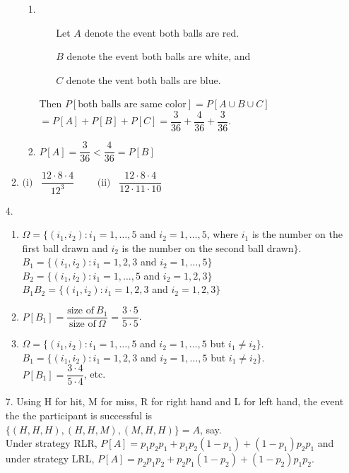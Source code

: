 \begin{enumerate}
\begin{enumerate}
\begin{enumerate}
			\item \begin{enumerate}
				\item[Let] $A$ denote the event both balls are red. 
				\item[] $B$ denote the event both balls are white, and 
				\item[] $C$ denote the vent both balls are blue. 
			\end{enumerate}
				Then $P[\text{both balls are same color}] = P[A\cup B\cup C]$ $= P[A]+P[B]+P[C] =  \dfrac{3}{36} + \dfrac{4}{36} + \dfrac{3}{36}$.
			
			\item $ P[A] = \dfrac{3}{36} < \dfrac{4}{36} = P[B]$
		\end{enumerate} 
		
		\item $\text{(i)}\;\;\; \dfrac{12\cdot 8\cdot 4}{12^3}\quad\quad$ $\text{(ii)}\;\;\; \dfrac{12\cdot 8\cdot 4}{12\cdot 11\cdot 10}$
		
	\end{enumerate}
	
	\newpage
	\item[4.] \begin{enumerate}
	
		\item $\Omega = \{(i_1,i_2)\colon i_1=1,\ldots,5$ and $i_2=1,\ldots, 5$, where 
	$i_1$ is the number on the first ball drawn and 
	$i_2$ is the number on the second ball drawn$\}$. \\
	$B_1 = \{(i_1,i_2)\colon i_1=1,2,3$ and $i_2=1,\ldots, 5 \}$\\
	$B_2 = \{(i_1,i_2)\colon i_1=1,\ldots,5$ and $i_2=1, 2, 3 \}$\\
	$B_1B_2 = \{(i_1,i_2)\colon i_1=1,2,3$ and $i_2=1, 2, 3 \}$
	
		\item $P[B_1] = \dfrac{\text{size of}\ B_1}{\text{size of}\ \Omega} = \dfrac{3\cdot 5}{5\cdot 5}$.
		
		\item  $\Omega = \{(i_1,i_2)\colon i_1=1,\ldots,5$ and $i_2=1,\ldots, 5$ but $i_1\ne i_2\}$. \\
		$B_1 = \{(i_1,i_2)\colon i_1=1,2,3$ and $i_2=1,\ldots, 5$ but $i_1\ne i_2 \}$. \\
		$P[B_1] = \dfrac{3\cdot 4}{5\cdot 4}$, etc.
		\end{enumerate} 
	
	\item[7.] Using H for hit, M for miss, R for right hand and L for left hand, the event the the participant is successful is \\
	$\{(H,H,H), (H,H,M), (M,H,H)\} = A$, say. \\
	Under strategy RLR, $P[A] = p_1p_2p_1 + p_1p_2(1-p_1) + (1-p_1)p_2p_1$ and \\
	under strategy LRL, $P[A] = p_2p_1p_2 + p_2p_1(1-p_2) + (1-p_2)p_1p_2$. 
	 

\end{enumerate}

